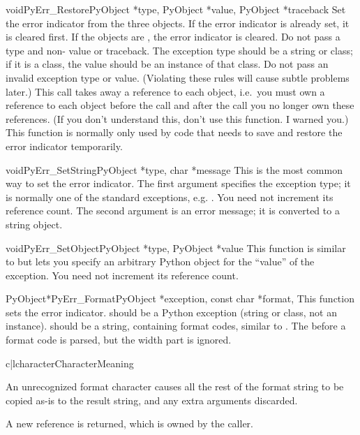 \documentclass{manual}
\begin{document}
\begin{cfuncdesc}{void}{PyErr_Restore}{PyObject *type, PyObject *value,
                                       PyObject *traceback}
Set  the error indicator from the three objects.  If the error
indicator is already set, it is cleared first.  If the objects are
\NULL{}, the error indicator is cleared.  Do not pass a \NULL{} type
and non-\NULL{} value or traceback.  The exception type should be a
string or class; if it is a class, the value should be an instance of
that class.  Do not pass an invalid exception type or value.
(Violating these rules will cause subtle problems later.)  This call
takes away a reference to each object, i.e.\ you must own a reference
to each object before the call and after the call you no longer own
these references.  (If you don't understand this, don't use this
function.  I warned you.)    This function is normally
only used by code that needs to save and restore the error indicator
temporarily.
\end{cfuncdesc}

\begin{cfuncdesc}{void}{PyErr_SetString}{PyObject *type, char *message}
This is the most common way to set the error indicator.  The first
argument specifies the exception type; it is normally one of the
standard exceptions, e.g. .  You need not
increment its reference count.  The second argument is an error
message; it is converted to a string object.
\end{cfuncdesc}

\begin{cfuncdesc}{void}{PyErr_SetObject}{PyObject *type, PyObject *value}
This function is similar to  but lets you
specify an arbitrary Python object for the ``value'' of the exception.
You need not increment its reference count.
\end{cfuncdesc}

\begin{cfuncdesc}{PyObject*}{PyErr_Format}{PyObject *exception,
                                           const char *format, \moreargs}
This function sets the error indicator.   should be a
Python exception (string or class, not an instance).
 should be a string, containing format codes, similar to 
. The  before a format code
is parsed, but the width part is ignored.

\begin{tableii}{c|l}{character}{Character}{Meaning}
\end{tableii}

An unrecognized format character causes all the rest of
the format string to be copied as-is to the result string,
and any extra arguments discarded.

A new reference is returned, which is owned by the caller.
\end{cfuncdesc}
\end{document}
